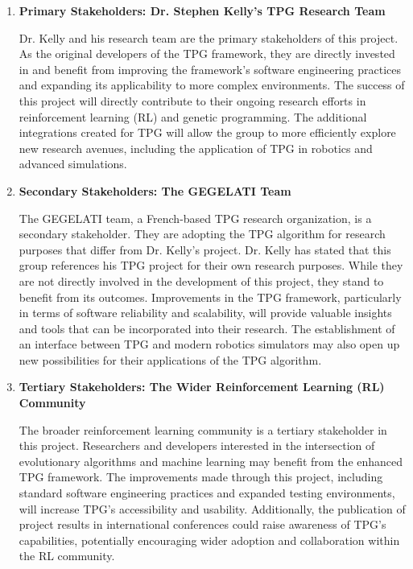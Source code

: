 \documentclass{article}
\begin{document}
\begin{enumerate}
    \item \textbf{Primary Stakeholders: Dr. Stephen Kelly’s TPG Research Team}

    Dr. Kelly and his research team are the primary stakeholders of this project. As the original developers of the TPG framework, they are directly invested in and benefit from improving the framework’s software engineering practices and expanding its applicability to more complex environments. The success of this project will directly contribute to their ongoing research efforts in reinforcement learning (RL) and genetic programming. The additional integrations created for TPG will allow the group to more efficiently explore new research avenues, including the application of TPG in robotics and advanced simulations.

       \item \textbf{Secondary Stakeholders: The GEGELATI Team}

       The GEGELATI team, a French-based TPG research organization, is a secondary stakeholder. They are adopting the TPG algorithm for research purposes that differ from Dr. Kelly’s project. Dr. Kelly has stated that this group references his TPG project for their own research purposes. While they are not directly involved in the development of this project, they stand to benefit from its outcomes. Improvements in the TPG framework, particularly in terms of software reliability and scalability, will provide valuable insights and tools that can be incorporated into their research. The establishment of an interface between TPG and modern robotics simulators may also open up new possibilities for their applications of the TPG algorithm.

         \item \textbf{Tertiary Stakeholders: The Wider Reinforcement Learning (RL) Community}

         The broader reinforcement learning community is a tertiary stakeholder in this project. Researchers and developers interested in the intersection of evolutionary algorithms and machine learning may benefit from the enhanced TPG framework. The improvements made through this project, including standard software engineering practices and expanded testing environments, will increase TPG’s accessibility and usability. Additionally, the publication of project results in international conferences could raise awareness of TPG’s capabilities, potentially encouraging wider adoption and collaboration within the RL community.


\end{enumerate}
\end{document}
